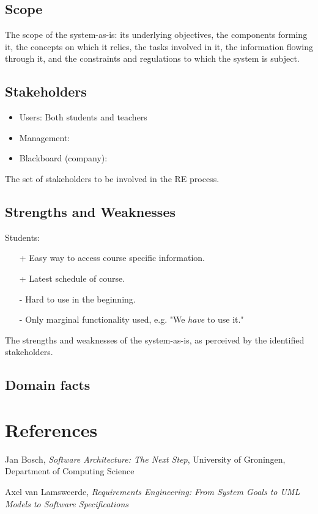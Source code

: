 \section{Scope}
The scope of the system-as-is: its underlying objectives, the components forming it, the
concepts on which it relies, the tasks involved in it, the information flowing through it,
and the constraints and regulations to which the system is subject.

\section{Stakeholders}
\begin{itemize}
	\item Users: Both students and teachers
	\item Management:
	\item Blackboard (company):
\end{itemize}

The set of stakeholders to be involved in the RE process.

\section{Strengths and Weaknesses}
Students:
\begin{itemize}
	\item[+] Easy way to access course specific information.
	\item[+] Latest schedule of course.
	\item[-] Hard to use in the beginning.
	\item[-] Only marginal functionality used, e.g. "We \textit{have} to use it."
\end{itemize}



The strengths and weaknesses of the system-as-is, as perceived by the identified stakeholders.

\section{Domain facts}


\chapter{References}

\begin{thebibliography}{9}
	
	Jan Bosch,
	\emph{Software Architecture: The Next Step},
	University of Groningen, Department of Computing Science
	
	Axel van Lamsweerde,
	\emph{Requirements Engineering: From System Goals to UML Models to Software Specifications}
	
	
\end{thebibliography}


\appendix



